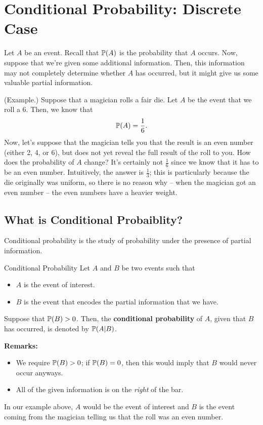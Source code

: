 \documentclass[letterpaper]{article}
\begin{document}
\section{Conditional Probability: Discrete Case}
Let $A$ be an event. Recall that $\mathbb{P}(A)$ is the probability that $A$ occurs. Now, suppose that we're given some additional information. Then, this information may not completely determine whether $A$ has occurred, but it might give us some valuable partial information. 

\begin{mdframed}[]
    (Example.) Suppose that a magician rolls a fair die. Let $A$ be the event that we roll a 6. Then, we know that 
    \[\mathbb{P}(A) = \frac{1}{6}.\]
    Now, let's suppose that the magician tells you that the result is an even number (either 2, 4, or 6), but does not yet reveal the full result of the roll to you. How does the probability of $A$ change? It's certainly not $\frac{1}{6}$ since we know that it has to be an even number. Intuitively, the answer is $\frac{1}{3}$; this is particularly because the die originally was uniform, so there is no reason why -- when the magician got an even number -- the even numbers have a heavier weight. 
\end{mdframed}

\subsection{What is Conditional Probaiblity?}
Conditional probability is the study of probability under the presence of partial information. 
\begin{definition}{Conditional Probability}{}
    Let $A$ and $B$ be two events such that 
    \begin{itemize}
        \item $A$ is  the event of interest.
        \item $B$ is the event that encodes the partial information that we have. 
    \end{itemize}
    Suppose that $\mathbb{P}(B) > 0$. Then, the \textbf{conditional probability} of $A$, given that $B$ has occurred, is denoted by $\mathbb{P}(A | B)$.  
\end{definition}
\textbf{Remarks:} 
\begin{itemize}
    \item We require $\mathbb{P}(B) > 0$; if $\mathbb{P}(B) = 0$, then this would imply that $B$ would never occur anyways. 
    \item All of the given information is on the \emph{right} of the bar. 
\end{itemize}
In our example above, $A$ would be the event of interest and $B$ is the event coming from the magician telling us that the roll was an even number. 
\end{document}
